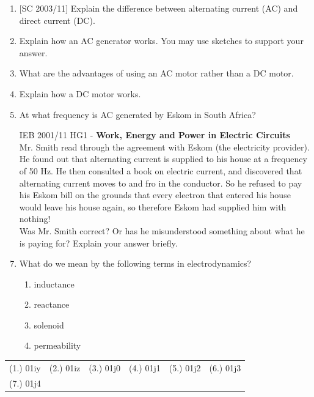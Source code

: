 \begin{eocexercises}{}
\begin{enumerate}
\item{[SC 2003/11] Explain the difference between alternating current (AC) and direct current (DC).}

\item Explain how an AC generator works. You may use sketches to support your answer.

\item What are the advantages of using an AC motor rather than a DC motor.

\item Explain how a DC motor works.
 
\item At what frequency is AC generated by Eskom in South Africa?

\item [IEB 2001/11 HG1] - \textbf{Work, Energy and Power in Electric Circuits}\\
Mr. Smith read through the agreement with Eskom (the electricity provider). He found out that alternating current is supplied to his house at a frequency of 50 Hz. He then consulted a book on electric current, and discovered that alternating current moves to and fro in the conductor. So he refused to pay his Eskom bill on the grounds that every electron that entered his house would leave his house again, so therefore Eskom had supplied him with nothing!\\
 
Was Mr. Smith correct? Or has he misunderstood something about what he is paying for? Explain your answer briefly.
 

\item What do we mean by the following terms in electrodynamics?
\begin{enumerate}
\item inductance
\item reactance
\item solenoid
\item permeability

\end{enumerate}

\end{enumerate}


\par \practiceinfo
\par \begin{tabular}[h]{cccccc}
(1.)	01iy	&
(2.)	01iz	&
(3.)	01j0	&
(4.)	01j1	&
(5.)	01j2	&
(6.)	01j3	\\ %
(7.)	01j4	&
\end{tabular}
\end{eocexercises}





\setlength{\parskip}{2ex}

